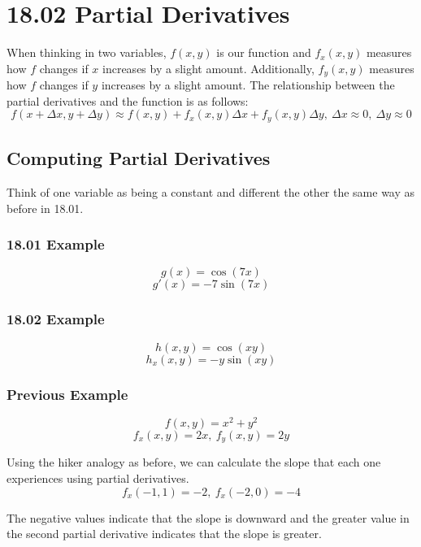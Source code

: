 \documentclass{article}
\begin{document}
\section{ 18.02 Partial Derivatives }

When thinking in two variables, $ f(x, y) $ is our function and $ f_{x}(x, y) $
measures how $f$ changes if $x$ increases by a slight amount. Additionally, $
f_{y}(x, y) $ measures how $f$ changes if $y$ increases by a slight amount. The
relationship between the partial derivatives and the function is as follows:
$$ f(x + \Delta x, y + \Delta y) \approx f(x, y) + f_{x}(x, y) \Delta x +
f_{y}(x, y) \Delta y,\ \Delta x \approx 0,\ \Delta y \approx 0$$

\subsection{ Computing Partial Derivatives }

Think of one variable as being a constant and different the other the same way
as before in 18.01.

\subsubsection{ 18.01 Example }

$$ g(x) = \cos(7x) $$
$$ g'(x) = -7 \sin(7x) $$

\subsubsection{ 18.02 Example }

$$ h(x, y) = \cos(xy) $$
$$ h_{x}(x, y) = -y \sin(xy) $$

\subsubsection{ Previous Example }

$$ f(x, y) = x^{2} + y^{2} $$
$$ f_{x}(x, y) = 2x,\ f_{y}(x, y) = 2y $$

Using the hiker analogy as before, we can calculate the slope that each one
experiences using partial derivatives.
$$ f_{x}(-1, 1) = -2,\ f_{x}(-2, 0) = -4 $$

The negative values indicate that the slope is downward and the greater value in
the second partial derivative indicates that the slope is greater.
\end{document}
